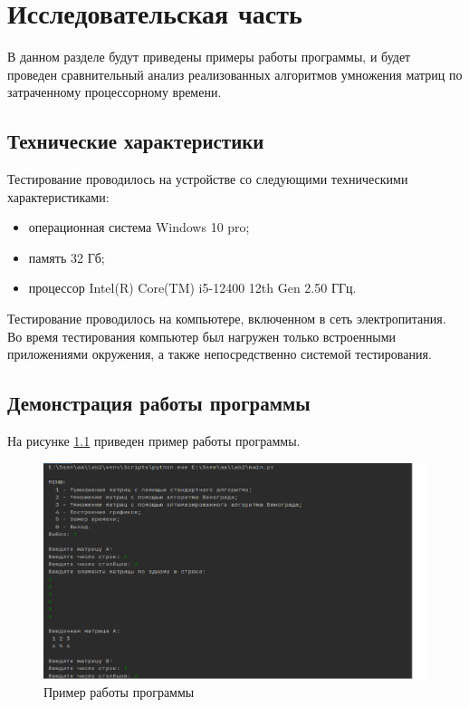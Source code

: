 \chapter{Исследовательская часть}

В данном разделе будут приведены примеры работы программы, и будет проведен сравнительный анализ реализованных алгоритмов умножения матриц по затраченному процессорному времени.

\section{Технические характеристики}

Тестирование проводилось на устройстве со следующими техническими характеристиками:

\begin{itemize}
	\item операционная система Windows 10 pro;
	\item память 32 Гб;
	\item процессор Intel(R) Core(TM) i5-12400 12th Gen 2.50 ГГц.
\end{itemize}

Тестирование проводилось на компьютере, включенном в сеть электропитания. Во время тестирования компьютер был нагружен только встроенными приложениями окружения, а также непосредственно системой тестирования.

\clearpage

\section{Демонстрация работы программы}

На рисунке \ref{img:example} приведен пример работы программы.

\begin{figure}[H]
	\begin{center}
		\includegraphics[scale=0.5]{img/example.png}
	\end{center}
	\captionsetup{justification=centering}
	\caption{Пример работы программы}
	\label{img:example}
\end{figure}

